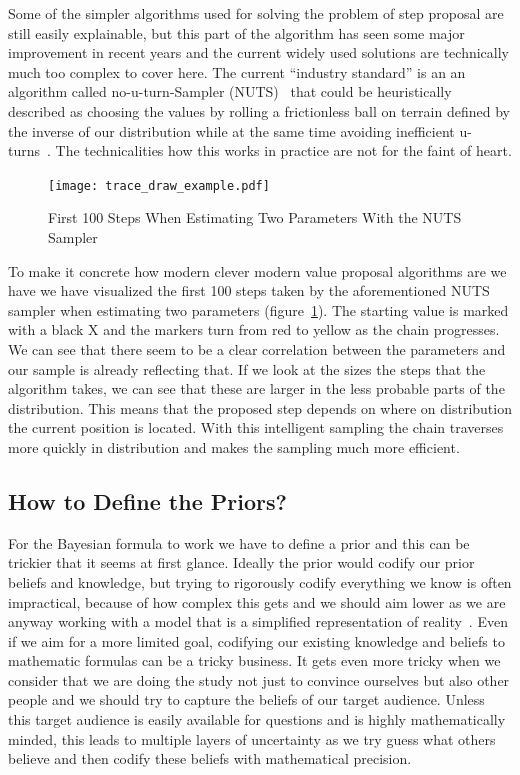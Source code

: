 \documentclass[12pt,a4paper,leqno]{report}
\theoremstyle{plain}
\theoremstyle{definition}
\theoremstyle{remark}
\begin{document}
Some of the simpler algorithms used for solving the problem of step proposal are still easily explainable, but
this part of the algorithm has seen some major improvement in recent years and the
current widely used solutions are technically much too complex to cover here. The
current ``industry standard'' is an an algorithm called no-u-turn-Sampler (NUTS)\ \cite{nuts}
that could be heuristically described as choosing the values by rolling a frictionless
ball on terrain defined by the inverse of our distribution while at the same time
avoiding inefficient u-turns\ \cite{kruschke}. The technicalities how this works
in practice are not for the faint of heart.

\begin{figure}[H]
    \centering
    \caption{First 100 Steps When Estimating Two Parameters With the NUTS Sampler}\label{traceexample}
    \texttt{[image: trace\_draw\_example.pdf]}
\end{figure}

To make it concrete how modern clever modern value proposal algorithms are we
have we have visualized the first 100 steps taken by the aforementioned NUTS sampler
when estimating two parameters (figure\ \ref{traceexample}). The starting value is
marked with a black X and the markers turn from red to yellow as the chain progresses.
We can see that there seem to be a clear correlation between the parameters and our
sample is already reflecting that. If we look at the sizes the steps that the algorithm
takes, we can see that these are larger in the less probable parts of the distribution.
This means that the proposed step depends on where on distribution the current position
is located. With this intelligent sampling the chain traverses more
quickly in distribution and makes the sampling much more efficient.

\subsection{How to Define the Priors?}\label{bayesproblems}

For the Bayesian formula to work we have to define a prior and this can be
trickier that it seems at first glance. Ideally the prior would codify our prior
beliefs and knowledge, but trying to rigorously codify everything we
know is often impractical, because of how complex this gets and we should aim lower as we are
anyway working with a model that is a simplified representation of reality\ \cite{gelman}. Even if
we aim for a more limited goal, codifying our existing knowledge and beliefs
to mathematic formulas can be a tricky business. It gets even more
tricky when we consider that we are doing the study not just to convince ourselves
but also other people and we should try to capture the beliefs of our target audience.
Unless this target audience is easily available for questions and is highly mathematically minded,
this leads to multiple layers of uncertainty as we try guess what others
believe and then codify these beliefs with mathematical precision.
\end{document}
